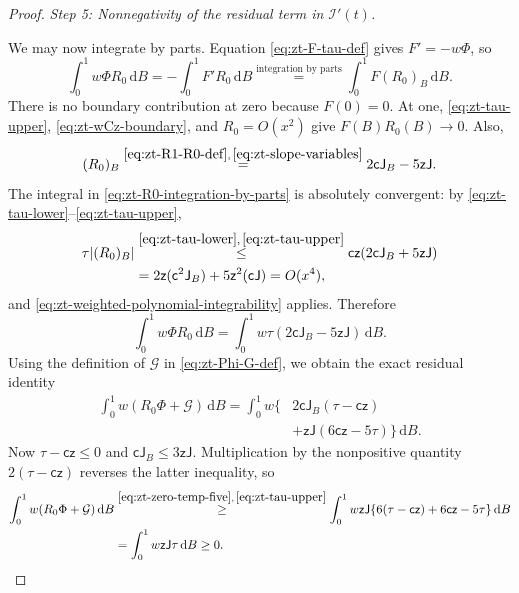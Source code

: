 \documentclass[10pt]{amsart}
\theoremstyle{definition}
\theoremstyle{remark}
\numberwithin{equation}{section}
\newcommand{\1}{\mathbf 1}
\newcommand{\cI}{\mathcal I}
\newcommand{\cG}{\mathcal G}
\newcommand{\dd}{\,\mathrm d}
\newcommand{\stackref}[2]{\stackrel{#2}{#1}}
\begin{document}
\begin{proof}
\smallskip
\noindent\emph{Step 5: Nonnegativity of the residual term in $\cI'(t)$.}

We may now integrate by parts. Equation \eqref{eq:zt-F-tau-def} gives $F'=-w\Phi$, so
\begin{equation}
 \int_0^1w\Phi R_0\dd B
 =-\int_0^1F'R_0\dd B
 \stackref{=}{\text{integration by parts}}
 \int_0^1F(R_0)_B\dd B.
 \label{eq:zt-R0-integration-by-parts}
\end{equation}
There is no boundary contribution at zero because $F(0)=0$. At one, \eqref{eq:zt-tau-upper}, \eqref{eq:zt-wCz-boundary}, and $R_0=O(x^2)$ give $F(B)R_0(B)\to0$. Also,
\begin{equation*}
 (R_0)_B
 \stackref{=}{\eqref{eq:zt-R1-R0-def},\,\eqref{eq:zt-slope-variables}}
 2\mathsf c\mathsf J_B-5\mathsf z\mathsf J.
\end{equation*}
The integral in \eqref{eq:zt-R0-integration-by-parts} is absolutely convergent: by \eqref{eq:zt-tau-lower}--\eqref{eq:zt-tau-upper},
\begin{align*}
 \tau|(R_0)_B|
 &\stackref{\leq}{\eqref{eq:zt-tau-lower},\,\eqref{eq:zt-tau-upper}}
 \mathsf c\mathsf z(2\mathsf c\mathsf J_B+5\mathsf z\mathsf J) \\
 &=2\mathsf z(\mathsf c^2\mathsf J_B)+5\mathsf z^2(\mathsf c\mathsf J)=O(x^4),
\end{align*}
and \eqref{eq:zt-weighted-polynomial-integrability} applies.  Therefore
\begin{equation*}
 \int_0^1w\Phi R_0\dd B
 =\int_0^1w\tau(2\mathsf c\mathsf J_B-5\mathsf z\mathsf J)\dd B.
\end{equation*}
Using the definition of $\cG$ in \eqref{eq:zt-Phi-G-def}, we obtain the exact residual identity
\begin{align*}
 \int_0^1w(R_0\Phi+\cG)\dd B
 =\int_0^1w\{&
 2\mathsf c\mathsf J_B(\tau-\mathsf c\mathsf z) \\
 &+\mathsf z\mathsf J(6\mathsf c\mathsf z-5\tau)\}\dd B.
\end{align*}
Now $\tau-\mathsf c\mathsf z\leq0$ and $\mathsf c\mathsf J_B\leq3\mathsf z\mathsf J$.  Multiplication by the nonpositive quantity $2(\tau-\mathsf c\mathsf z)$ reverses the latter inequality, so
\begin{align}
 \int_0^1w(R_0\Phi+\cG)\dd B
 &\stackref{\geq}{\eqref{eq:zt-zero-temp-five},\,\eqref{eq:zt-tau-upper}}
 \int_0^1w\mathsf z\mathsf J\{6(\tau-\mathsf c\mathsf z)+6\mathsf c\mathsf z-5\tau\}\dd B \notag\\
 &=\int_0^1w\mathsf z\mathsf J\tau\dd B\geq0.                                \label{eq:zt-residual-nonnegative}
\end{align}


\end{proof}
\end{document}
